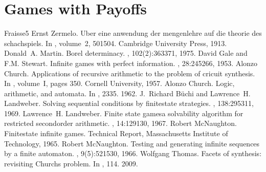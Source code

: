 \documentclass[letterpaper,10pt,english]{sphinxmanual}
\begin{document}
\chapter{Games with Payoffs}
\label{\detokenize{4_Payoffs/main:games-with-payoffs}}\label{\detokenize{4_Payoffs/main:chap-payoffs}}\label{\detokenize{4_Payoffs/main::doc}}
\begin{sphinxthebibliography}{Fraisse5}
Ernst Zermelo. Uber eine anwendung der mengenlehre auf die theorie des schachspiels. In , volume 2, 501\textendash{}504. Cambridge University Press, 1913.
Donald A. Martin. Borel determinacy. , 102(2):363\textendash{}371, 1975.
David Gale and F.M. Stewart. Infinite games with perfect information. , 28:245\textendash{}266, 1953.
Alonzo Church. Applications of recursive arithmetic to the problem of cricuit synthesis. In , volume I, pages 3\textendash{}50. Cornell University, 1957.
Alonzo Church. Logic, arithmetic, and automata. In , 23\textendash{}35. 1962.
J. Richard Büchi and Lawrence H. Landweber. Solving sequential conditions by finite\sphinxhyphen{}state strategies. , 138:295\textendash{}311, 1969.
Lawrence H. Landweber. Finite state games\textendash{}a solvability algorithm for restricted second\sphinxhyphen{}order arithmetic. , 14:129\textendash{}130, 1967.
Robert McNaughton. Finite\sphinxhyphen{}state infinite games. Technical Report, Massachusetts Institute of Technology, 1965.
Robert McNaughton. Testing and generating infinite sequences by a finite automaton. , 9(5):521\textendash{}530, 1966.
Wolfgang Thomas. Facets of synthesis: revisiting Church\textquotesingle{}s problem. In , 1\textendash{}14. 2009.

\end{sphinxthebibliography}
\end{document}
